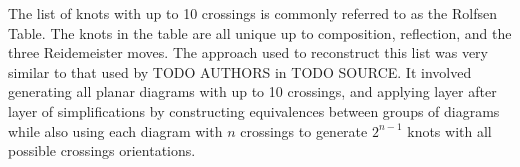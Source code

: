 
\theorems

\begin{paperabstract}
The list of knots with up to 10 crossings is commonly referred to as the Rolfsen
Table.
The knots in the table are all unique up to composition, reflection, and the
three Reidemeister moves.
The approach used to reconstruct this list was very similar to that used by TODO
AUTHORS in TODO SOURCE.
It involved generating all planar diagrams with up to 10 crossings, and applying
layer after layer of simplifications by constructing equivalences between groups
of diagrams while also using each diagram with $n$ crossings to generate
$2^{n-1}$ knots with all possible crossings orientations.
\end{paperabstract}

